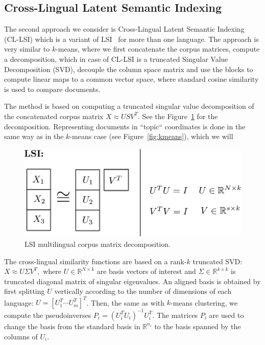 \documentclass[twoside,11pt]{article}
\newcommand{\RR}{\mathbb{R}}
\begin{document}
\subsection{Cross-Lingual Latent Semantic Indexing}\label{sec:LSI}

The second approach we consider is Cross-Lingual Latent Semantic Indexing (CL-LSI)\cite{cl_lsi} which is a variant of LSI~ for more than one language. The approach is very similar to $k$-means, where we first concatenate the corpus matrices, compute a decomposition, which in case of CL-LSI is a truncated Singular Value Decomposition (SVD), decouple the
 column space matrix and use the blocks to compute linear maps to a common vector space, where standard cosine similarity is used to compare documents.

 The method is based on computing a truncated singular value decomposition of the concatenated corpus matrix $X \approx U S V^T$. See the Figure~\ref{fig:lsi} for the decomposition. Representing documents in ``topic`` coordinates is done in the same way as in the $k$-means case (see Figure~\ref{fig:kmeans}), which we will

\begin{figure}[tbp]
\centering
\includegraphics[width=\textwidth]{lsi.pdf}
\caption{\label{fig:lsi} LSI multilingual corpus matrix decomposition.}
\end{figure}

The cross-lingual similarity functions are based on a rank-$k$ truncated SVD: $X \approx U \Sigma V^T,$ where $U \in \RR^{N \times k}$ are basis vectors of interest and $\Sigma \in \RR^{k \times k}$ is truncated diagonal matrix of singular eigenvalues. An aligned basis is obtained by first splitting $U$ vertically according to the number of dimensions of each language: $U = [U_1^T \cdots U_m^T]^T$. Then, the same as with $k$-means clustering, we compute the pseudoinverses $P_i = (U_i^T U_i)^{-1} U_i^T$. The matrices $P_i$ are used to change the basis from the standard basis in $\RR^{n_i}$ to the basis spanned by the columns of $U_i$.
\end{document}
